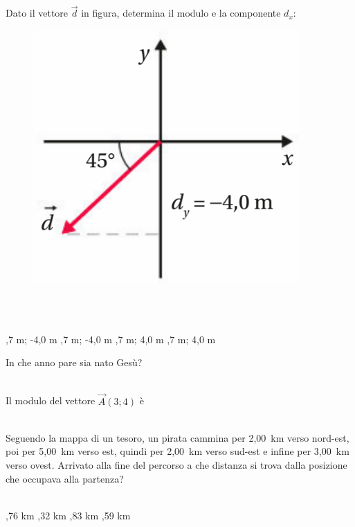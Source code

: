 \documentclass[a4paper,11pt]{exam}
\begin{document}
\begin{questions}
    
\question Dato il vettore $\vec{d}$ in figura, determina il modulo e la componente $d_x$: \begin{figure}[h!]   \begin{center}     \includegraphics[scale=0.35]{vettored.png}   \end{center} \end{figure}\\\
\begin{oneparchoices}
  ,7 m; -4,0 m
  ,7 m; -4,0 m
  \choice -5,7 m; 4,0 m
  ,7 m; 4,0 m
\end{oneparchoices}

    
\question In che anno pare sia nato Gesù?\\\
\begin{oneparchoices}
  \choice 20
  \choice 2019
\end{oneparchoices}

    
\question Il modulo del vettore $\vec{A}(3;4)$ è\\\
\begin{oneparchoices}
  \choice 25
  \choice 12
\end{oneparchoices}

    
\question Seguendo la mappa di un tesoro, un pirata cammina per 2,00~km verso nord-est, poi per 5,00~km verso est, quindi per 2,00~km verso sud-est e infine per 3,00~km verso ovest. Arrivato alla fine del percorso a che distanza si trova dalla posizione che occupava alla partenza?\\\
\begin{oneparchoices}
  ,76 km
  \choice 6,32 km
  \choice 4,83 km
  \choice 4,59 km
\end{oneparchoices}


\end{questions}
\end{document}
